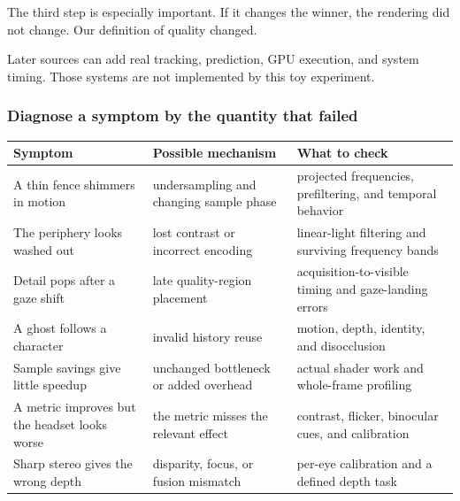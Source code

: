 The third step is especially important. If it changes the winner, the rendering did not change. Our definition of quality changed.

Later sources can add real tracking, prediction, GPU execution, and system timing. Those systems are not implemented by this toy experiment.

\subsubsection{Diagnose a symptom by the quantity that failed}\label{04-visual-computing-ii-ch043-diagnose-a-symptom-by-the-quantity-that-failed}

{\def\LTcaptype{none} %
\begin{longtable}[]{@{}
  >{\raggedright\arraybackslash}p{}
  >{\raggedright\arraybackslash}p{}
  >{\raggedright\arraybackslash}p{}@{}}
\toprule\noalign{}
\begin{minipage}[b]{\linewidth}\raggedright
Symptom
\end{minipage} & \begin{minipage}[b]{\linewidth}\raggedright
Possible mechanism
\end{minipage} & \begin{minipage}[b]{\linewidth}\raggedright
What to check
\end{minipage} \\
\midrule\noalign{}
\endhead
\bottomrule\noalign{}
\endlastfoot
A thin fence shimmers in motion & undersampling and changing sample phase & projected frequencies, prefiltering, and temporal behavior \\
The periphery looks washed out & lost contrast or incorrect encoding & linear-light filtering and surviving frequency bands \\
Detail pops after a gaze shift & late quality-region placement & acquisition-to-visible timing and gaze-landing errors \\
A ghost follows a character & invalid history reuse & motion, depth, identity, and disocclusion \\
Sample savings give little speedup & unchanged bottleneck or added overhead & actual shader work and whole-frame profiling \\
A metric improves but the headset looks worse & the metric misses the relevant effect & contrast, flicker, binocular cues, and calibration \\
Sharp stereo gives the wrong depth & disparity, focus, or fusion mismatch & per-eye calibration and a defined depth task \\
\end{longtable}
}

